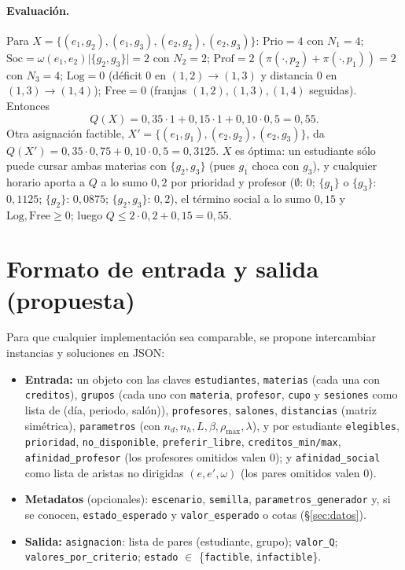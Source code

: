 \documentclass[11pt,letterpaper]{article}
\theoremstyle{definition}
\theoremstyle{remark}
\theoremstyle{plain}
\newcommand{\card}[1]{\lvert #1 \rvert}
\begin{document}
\paragraph{Evaluación.} Para $X=\{(e_1,g_2),(e_1,g_3),(e_2,g_2),(e_2,g_3)\}$:
$\mathrm{Prio}=4$ con $N_1=4$; $\mathrm{Soc}=\omega(e_1,e_2)\card{\{g_2,g_3\}}=2$
con $N_2=2$; $\mathrm{Prof}=2\,(\pi(\cdot,p_2)+\pi(\cdot,p_1))=2$ con $N_3=4$;
$\mathrm{Log}=0$ (déficit $0$ en $(1,2)\to(1,3)$ y distancia $0$ en
$(1,3)\to(1,4)$); $\mathrm{Free}=0$ (franjas $(1,2),(1,3),(1,4)$ seguidas).
Entonces
\[
Q(X)=0{,}35\cdot1+0{,}15\cdot1+0{,}10\cdot0{,}5=0{,}55 .
\]
Otra asignación factible, $X'=\{(e_1,g_1),(e_2,g_2),(e_2,g_3)\}$, da
$Q(X')=0{,}35\cdot0{,}75+0{,}10\cdot0{,}5=0{,}3125$.
$X$ es óptima: un estudiante sólo puede cursar ambas materias con
$\{g_2,g_3\}$ (pues $g_1$ choca con $g_3$), y cualquier horario aporta a
$Q$ a lo sumo $0{,}2$ por prioridad y profesor ($\emptyset$: $0$;
$\{g_1\}$ o $\{g_3\}$: $0{,}1125$; $\{g_2\}$: $0{,}0875$; $\{g_2,g_3\}$:
$0{,}2$), el término social a lo sumo $0{,}15$ y $\mathrm{Log},\mathrm{Free}\ge0$;
luego $Q\le 2\cdot0{,}2+0{,}15=0{,}55$.

\section{Formato de entrada y salida (propuesta)}
Para que cualquier implementación sea comparable, se propone intercambiar
instancias y soluciones en JSON:
\begin{itemize}[nosep]
  \item \textbf{Entrada:} un objeto con las claves
        \texttt{estudiantes}, \texttt{materias} (cada una con
        \texttt{creditos}), \texttt{grupos} (cada uno con \texttt{materia},
        \texttt{profesor}, \texttt{cupo} y \texttt{sesiones} como lista de
        (día, periodo, salón)), \texttt{profesores}, \texttt{salones},
        \texttt{distancias} (matriz simétrica),
        \texttt{parametros} (con $n_d,n_h,L,\beta,\rho_{\max},\lambda$), y por
        estudiante \texttt{elegibles}, \texttt{prioridad},
        \texttt{no\_disponible}, \texttt{preferir\_libre},
        \texttt{creditos\_min/max}, \texttt{afinidad\_profesor} (los profesores
        omitidos valen $0$); y \texttt{afinidad\_social} como lista de aristas
        no dirigidas $(e,e',\omega)$ (los pares omitidos valen $0$).
  \item \textbf{Metadatos} (opcionales): \texttt{escenario}, \texttt{semilla},
        \texttt{parametros\_generador} y, si se conocen,
        \texttt{estado\_esperado} y \texttt{valor\_esperado} o cotas
        (§\ref{sec:datos}).
  \item \textbf{Salida:} \texttt{asignacion}: lista de pares
        (estudiante, grupo); \texttt{valor\_Q}; \texttt{valores\_por\_criterio};
        \texttt{estado} $\in$ \{\texttt{factible}, \texttt{infactible}\}.
\end{itemize}
\end{document}

